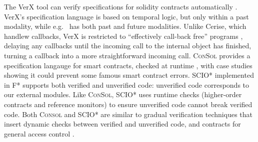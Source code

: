 




The VerX tool can verify
specifications for solidity contracts automatically \cite{VerX}.
VerX's specification language is based on
temporal logic, 
but only within a past modality, while e.g.\ \citet{OOPSLA22} has both past
and future modalities.
%
%
%
%
%
%
Unlike Cerise, which handlew callbacks, VerX
is restricted to ``effectively call-back free'' programs
\cite{Grossman,relaxed-callbacks-ToDES},
delaying any callbacks until the
incoming call to the internal object has finished,
turning a callback
into a more straightforward  incoming call. 
%
\textsc{ConSol} \cite{consolidating-pldi2024}
provides a specification langauge for smart contracts,
checked at runtime \cite{FinFel01},  with case studies 
showing it could prevent some famous smart contract errors.
SCIO* \cite{secure-io-fstar-popl2024} implemented in
F*
supports both
verified and unverified code: unverified code 
corresponds to our external modules. 
Like \textsc{ConSol}, SCIO* uses runtime checks
(higher-order contracts and reference monitors)
to ensure unverified
code cannot break verified code.
Both \textsc{Consol} and SCIO* are 
similar to gradual verification techniques 
\cite{gradual-verification-popl2024,Cok2022} that
insert dynamic checks between verified and unverified code,
and contracts for general access control 
\cite{DPCC14,AuthContract,cedar-oopsla2024}.


